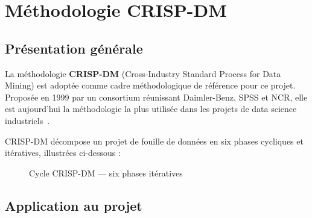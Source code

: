 \documentclass[12pt,a4paper,twoside]{report}
\theoremstyle{definition}
\begin{document}
\section{Méthodologie CRISP-DM}

\subsection{Présentation générale}

La méthodologie \textbf{CRISP-DM} (Cross-Industry Standard Process for Data Mining)
est adoptée comme cadre méthodologique de référence pour ce projet. Proposée en 1999
par un consortium réunissant Daimler-Benz, SPSS et NCR, elle est aujourd'hui la
méthodologie la plus utilisée dans les projets de data science industriels~\cite{crispwirth2000}.

CRISP-DM décompose un projet de fouille de données en six phases cycliques et itératives,
illustrées ci-dessous :

\begin{figure}[H]
\centering
{}
\caption{Cycle CRISP-DM — six phases itératives}
\label{fig:crisp_cycle}
\end{figure}

\subsection{Application au projet}
\end{document}
